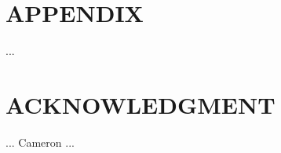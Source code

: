 \documentclass[letterpaper, 10 pt, conference]{ieeeconf}  %
\begin{document}

\section*{APPENDIX}

...

\section*{ACKNOWLEDGMENT}

... Cameron ...




\end{document}
